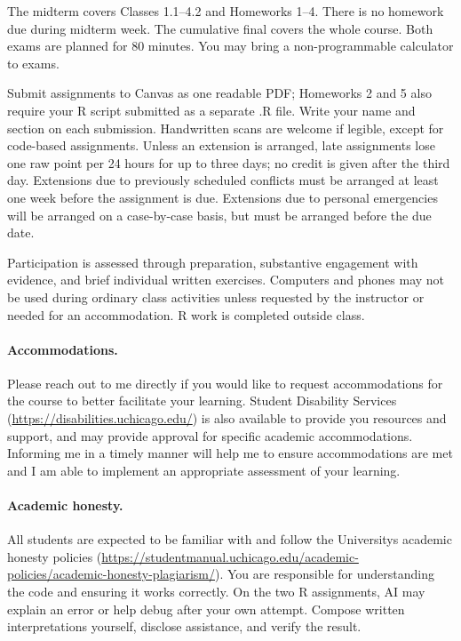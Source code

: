 \documentclass[letterpaper, 12pt, parskip=full,DIV=10]{scrartcl}
\begin{document}
The midterm covers Classes 1.1--4.2 and Homeworks 1--4. 
There is no homework due during midterm week.
The cumulative final covers the whole course. 
Both exams are planned for 80 minutes.
You may bring a non-programmable calculator to exams. 

Submit assignments to Canvas as one readable PDF; Homeworks 2 and 5 also require your R script submitted as a separate .R file. 
Write your name and section on each submission.
Handwritten scans are welcome if legible, except for code-based assignments. 
Unless an extension is arranged, late assignments lose one raw point per 24 hours for up to three days; no credit is given after the third day. 
Extensions due to previously scheduled conflicts must be arranged at least one week before the assignment is due. 
Extensions due to personal emergencies will be arranged on a case-by-case basis, but must be arranged before the due date. 

Participation is assessed through preparation, substantive engagement with evidence, and brief individual written exercises.
Computers and phones may not be used during ordinary class activities unless requested by the instructor or needed for an accommodation. 
R work is completed outside class.

\paragraph{Accommodations.}
Please reach out to me directly if you would like to request accommodations for the course to better facilitate your learning.
Student Disability Services (\url{https://disabilities.uchicago.edu/}) is also available to provide you resources and support, and may provide approval for specific academic accommodations.
Informing me in a timely manner will help me to ensure accommodations are met and I am able to implement an appropriate assessment of your learning.

\paragraph{Academic honesty.}
All students are expected to be familiar with and follow the University\textquotesingle s academic honesty policies (\url{https://studentmanual.uchicago.edu/academic-policies/academic-honesty-plagiarism/}).
You are responsible for understanding the code and ensuring it works correctly.
On the two R assignments, AI may explain an error or help debug after your own attempt. Compose written interpretations yourself, disclose assistance, and verify the result. 
\end{document}
